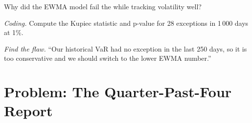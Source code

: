 \begin{exercise}[$\star\star$]\label{exo:rc:market-risk-measures:6}
Why did the EWMA model fail the  while tracking volatility well?
\end{exercise}

\begin{exercise}[$\star\star\star$]\label{exo:rc:market-risk-measures:7}
\emph{Coding.} Compute the Kupiec statistic and p-value for 28 exceptions in 1\,000 days at 1\%.
\end{exercise}

\begin{exercise}[$\star\star\star$]\label{exo:rc:market-risk-measures:8}
\emph{Find the flaw.} ``Our historical VaR had no exception in the last 250 days, so it is too
conservative and we should switch to the lower EWMA number.''
\end{exercise}

\section{Problem: The Quarter-Past-Four Report}

